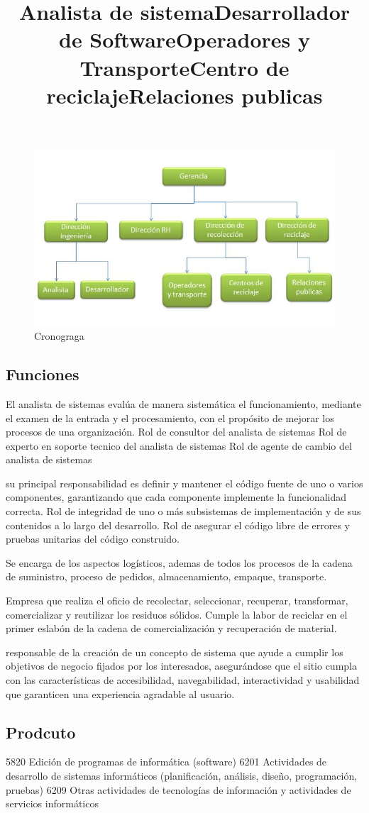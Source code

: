 \begin{figure}[h!]
	\centering
	\includegraphics[width=0.7\linewidth]{Proyecto/Organizacion/imgs/Organigrma}
	\caption{Cronograga}
\end{figure}


\subsection{Funciones}

\title{Analista de sistema}
El analista de sistemas evalúa de manera sistemática el funcionamiento, mediante el examen de la entrada y el procesamiento, con el propósito de mejorar los procesos de una organización. 
Rol de consultor del analista de sistemas
Rol de experto en soporte tecnico del analista de sistemas
Rol de agente de cambio del analista de sistemas

\title{Desarrollador de Software}
su principal responsabilidad es definir y mantener el código fuente de uno o varios componentes, garantizando que cada componente implemente la funcionalidad correcta.
Rol de integridad de uno o más subsistemas de implementación y de sus contenidos a lo largo del desarrollo. 
Rol de asegurar el código libre de errores y pruebas unitarias del código construido.

\title{Operadores y Transporte}
Se encarga de los aspectos logísticos, ademas de todos los procesos de la cadena de suministro, proceso de pedidos, almacenamiento, empaque, transporte.

\title{Centro de reciclaje}
Empresa que realiza el oficio de recolectar, seleccionar, recuperar, transformar, comercializar y reutilizar los residuos sólidos. Cumple la labor de reciclar en el primer eslabón de la cadena de comercialización y recuperación de material.

\title{Relaciones publicas}
responsable de la creación de un concepto de sistema que ayude a cumplir los objetivos de negocio fijados por los interesados, asegurándose que el sitio cumpla con las características de accesibilidad, navegabilidad, interactividad y usabilidad que garanticen una experiencia agradable al usuario. 


\subsection{Prodcuto}

5820 Edición de programas de informática (software)
6201 Actividades de desarrollo de sistemas informáticos (planificación, análisis, diseño, programación, pruebas)
6209 Otras actividades de tecnologías de información y actividades de servicios informáticos
